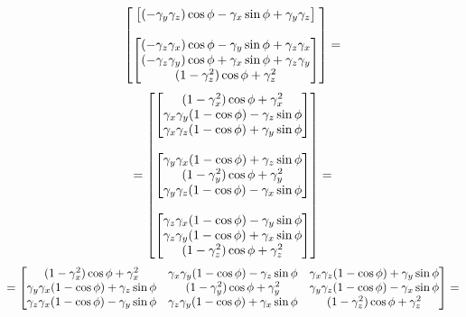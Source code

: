 \[\begin{bmatrix}
\begin{bmatrix}
            (-\gamma_y \gamma_z) \cos \phi - \gamma_x \sin \phi + \gamma_y \gamma_z \\
        \end{bmatrix} \\ \\
        \begin{bmatrix}
            (-\gamma_z \gamma_x) \cos \phi - \gamma_y \sin \phi + \gamma_z \gamma_x \\
            (-\gamma_z \gamma_y) \cos \phi + \gamma_x \sin \phi + \gamma_z \gamma_y \\
            (1 - \gamma_z^2) \cos \phi + \gamma_z^2 \\
        \end{bmatrix} \\
    \end{bmatrix} =
\]
\[
    =
    \begin{bmatrix}
        \begin{bmatrix}
            (1 - \gamma_x^2) \cos \phi + \gamma_x^2 \\
            \gamma_x \gamma_y (1 - \cos \phi) - \gamma_z \sin \phi \\
            \gamma_x \gamma_z (1 - \cos \phi) + \gamma_y \sin \phi \\
        \end{bmatrix} \\ \\
        \begin{bmatrix}
            \gamma_y \gamma_x (1 - \cos \phi) + \gamma_z \sin \phi \\
            (1 - \gamma_y^2) \cos \phi + \gamma_y^2 \\
            \gamma_y \gamma_z (1 - \cos \phi) - \gamma_x \sin \phi \\
        \end{bmatrix} \\ \\
        \begin{bmatrix}
            \gamma_z \gamma_x (1 - \cos \phi) - \gamma_y \sin \phi \\
            \gamma_z \gamma_y (1 - \cos \phi) + \gamma_x \sin \phi \\
            (1 - \gamma_z^2) \cos \phi + \gamma_z^2 \\
        \end{bmatrix} \\
    \end{bmatrix} =
\]
\[
    =
    \begin{bmatrix}
        (1 - \gamma_x^2) \cos \phi + \gamma_x^2 &
        \gamma_x \gamma_y (1 - \cos \phi) - \gamma_z \sin \phi &
        \gamma_x \gamma_z (1 - \cos \phi) + \gamma_y \sin \phi \\
        \gamma_y \gamma_x (1 - \cos \phi) + \gamma_z \sin \phi &
        (1 - \gamma_y^2) \cos \phi + \gamma_y^2 &
        \gamma_y \gamma_z (1 - \cos \phi) - \gamma_x \sin \phi \\
        \gamma_z \gamma_x (1 - \cos \phi) - \gamma_y \sin \phi &
        \gamma_z \gamma_y (1 - \cos \phi) + \gamma_x \sin \phi &
        (1 - \gamma_z^2) \cos \phi + \gamma_z^2 \\
    \end{bmatrix} =
\]
